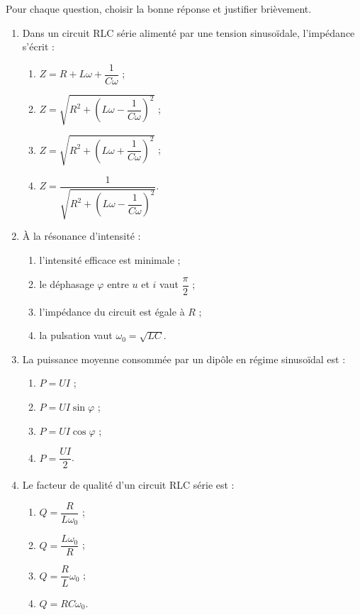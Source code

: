 \documentclass[11pt]{article}
\begin{document}
\begin{exercice}
Pour chaque question, choisir la bonne réponse et justifier brièvement.
\begin{enumerate}
\item Dans un circuit RLC série alimenté par une tension sinusoïdale, l'impédance s'écrit :
\begin{enumerate}
\item $Z = R + L\omega + \dfrac{1}{C\omega}$ ;
\item $Z = \sqrt{R^2 + \left(L\omega - \dfrac{1}{C\omega}\right)^2}$ ;
\item $Z = \sqrt{R^2 + \left(L\omega + \dfrac{1}{C\omega}\right)^2}$ ;
\item $Z = \dfrac{1}{\sqrt{R^2 + \left(L\omega - \dfrac{1}{C\omega}\right)^2}}$.
\end{enumerate}
\item À la résonance d'intensité :
\begin{enumerate}
\item l'intensité efficace est minimale ;
\item le déphasage $\varphi$ entre $u$ et $i$ vaut $\dfrac{\pi}{2}$ ;
\item l'impédance du circuit est égale à $R$ ;
\item la pulsation vaut $\omega_0 = \sqrt{LC}$.
\end{enumerate}
\item La puissance moyenne consommée par un dipôle en régime sinusoïdal est :
\begin{enumerate}
\item $P = UI$ ;
\item $P = UI\sin\varphi$ ;
\item $P = UI\cos\varphi$ ;
\item $P = \dfrac{UI}{2}$.
\end{enumerate}
\item Le facteur de qualité d'un circuit RLC série est :
\begin{enumerate}
\item $Q = \dfrac{R}{L\omega_0}$ ;
\item $Q = \dfrac{L\omega_0}{R}$ ;
\item $Q = \dfrac{R}{L}\omega_0$ ;
\item $Q = RC\omega_0$.
\end{enumerate}
\end{enumerate}
\end{exercice}
\end{document}
